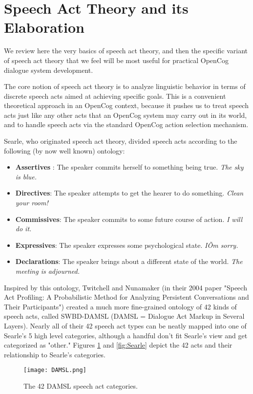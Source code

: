 \documentclass[10pt]{article}
\begin{document}
\section{Speech Act Theory and its Elaboration}

We review here the very basics of speech act theory, and then the specific variant of speech act theory that we feel will be most useful for practical OpenCog dialogue system development.

The core notion of speech act theory is to analyze linguistic behavior in terms of discrete speech acts aimed at achieving specific goals.  This is a convenient theoretical approach in an OpenCog context, because it pushes us to treat speech acts just like any other acts that an OpenCog system may carry out in its world, and to handle speech acts via the standard OpenCog action selection mechanism.

Searle, who originated speech act theory, divided speech acts according to the following (by now well known) ontology:

\begin{itemize}
\item {\bf Assertives} : The speaker commits herself to something being true. {\it The sky is blue.}
\item {\bf Directives}: The speaker attempts to get the hearer to do something. {\it Clean your room!}
\item {\bf Commissives}: The speaker commits to some future course of action. {\it I will do it.}
\item {\bf Expressives}: The speaker expresses some psychological state. {\it IÕm sorry.}
\item {\bf Declarations}: The speaker brings about a different state of the world. {\it The meeting is adjourned.}
\end{itemize}

Inspired by this ontology, Twitchell and Nunamaker (in their 2004 paper "Speech Act Profiling: A Probabilistic Method for Analyzing Persistent Conversations and Their Participants") created a much more fine-grained ontology of 42 kinds of speech acts, called SWBD-DAMSL (DAMSL = Dialogue Act Markup in Several Layers).  Nearly all of their 42 speech act types can be neatly mapped into one of Searle's 5 high level categories, although a handful don't fit Searle's view and get categorized as "other."  Figures \ref{fig:DAMSL} and \ref{fig:Searle} depict the 42 acts and their relationship to Searle's categories.

\begin{figure}[htb]
\centering
\texttt{[image: DAMSL.png]}
\caption{The 42 DAMSL speech act categories.}
\label{fig:DAMSL}
\end{figure}
\end{document}
